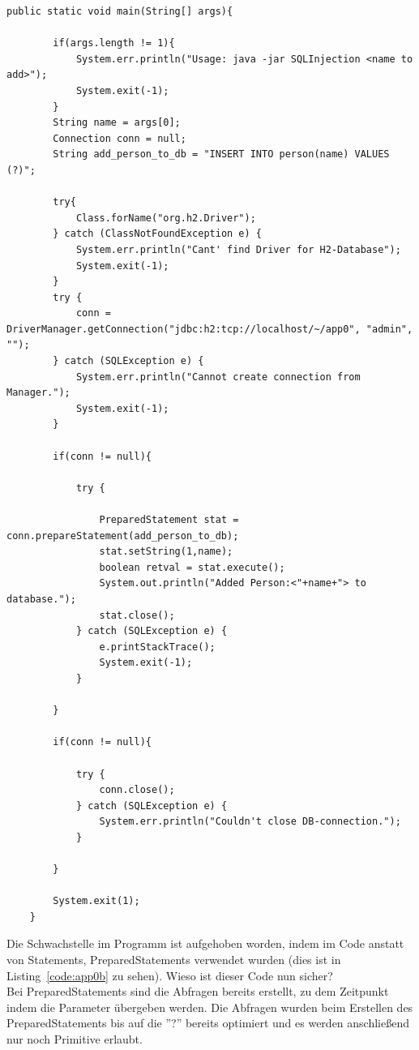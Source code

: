 \documentclass[12pt,a4paper,titlepage,oneside]{scrartcl}
\begin{document}
\begin{lstlisting}[caption=korregierter Code,label=code:app0b,style=c]
public static void main(String[] args){

        if(args.length != 1){
            System.err.println("Usage: java -jar SQLInjection <name to add>");
            System.exit(-1);
        }
        String name = args[0];
        Connection conn = null;
        String add_person_to_db = "INSERT INTO person(name) VALUES (?)";

        try{
            Class.forName("org.h2.Driver");
        } catch (ClassNotFoundException e) {
            System.err.println("Cant' find Driver for H2-Database");
            System.exit(-1);
        }
        try {
            conn = DriverManager.getConnection("jdbc:h2:tcp://localhost/~/app0", "admin", "");
        } catch (SQLException e) {
            System.err.println("Cannot create connection from Manager.");
            System.exit(-1);
        }

        if(conn != null){

            try {

                PreparedStatement stat = conn.prepareStatement(add_person_to_db);
                stat.setString(1,name);
                boolean retval = stat.execute();
                System.out.println("Added Person:<"+name+"> to database.");
                stat.close();
            } catch (SQLException e) {
                e.printStackTrace();
                System.exit(-1);
            }

        }

        if(conn != null){

            try {
                conn.close();
            } catch (SQLException e) {
                System.err.println("Couldn't close DB-connection.");
            }

        }

        System.exit(1);
    }
\end{lstlisting}

Die Schwachstelle im Programm ist aufgehoben worden, indem im Code anstatt von Statements, PreparedStatements verwendet wurden (dies ist in Listing~\ref*{code:app0b} zu sehen). Wieso ist dieser Code nun sicher? \\
Bei PreparedStatements sind die Abfragen bereits erstellt, zu dem Zeitpunkt indem die Parameter übergeben werden. Die Abfragen wurden beim Erstellen des PreparedStatements bis auf die ''?'' bereits optimiert und es werden anschließend nur noch Primitive erlaubt.
\end{document}
